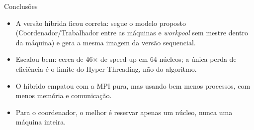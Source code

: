 \documentclass[aspectratio=169,11pt]{beamer}
\begin{document}
\begin{frame}{Conclusões}
\begin{itemize}\setlength{\itemsep}{14pt}
  \item A versão híbrida ficou correta: segue o modelo proposto (Coordenador/Trabalhador entre as máquinas e \emph{workpool} sem mestre dentro da máquina) e gera a mesma imagem da versão sequencial.
  \item Escalou bem: cerca de 46$\times$ de speed-up em 64 núcleos; a única perda de eficiência é o limite do Hyper-Threading, não do algoritmo.
  \item O híbrido empatou com a MPI pura, mas usando bem menos processos, com menos memória e comunicação.
  \item Para o coordenador, o melhor é reservar apenas um núcleo, nunca uma máquina inteira.
\end{itemize}
\end{frame}
\end{document}
